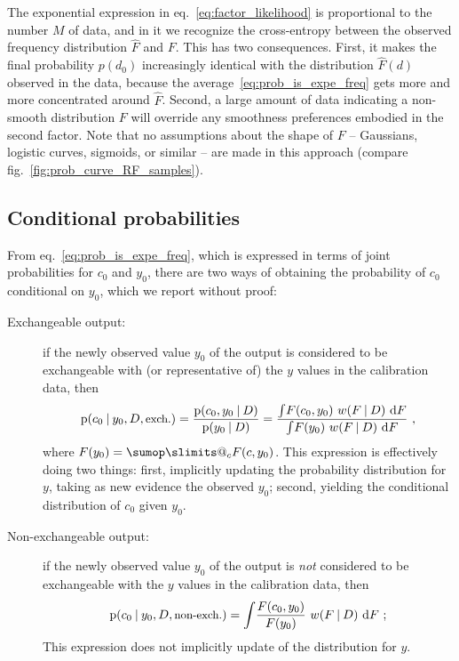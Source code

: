 \documentclass[\ifafour a4paper,12pt,\else a5paper,10pt,\fi%
onecolumn,oneside,article,%
british%
]{memoir}
\makeatletter
\theoremstyle{remark}
\theoremstyle{innote}
\def\sum{\DOTSI\sumop\slimits@}
\newcommand*{\di}{\mathrm{d}}%
\newcommand*{\p}{\mathrm{p}}%
\renewcommand*{\|}[1][]{\nonscript\:#1\vert\nonscript\:\mathopen{}}
\newcommand*{\eqn}{eq.}%
\newcommand*{\fig}{fig.}%
\newcommand*{\wf}{w}
\newcommand*{\texts}[1]{\text{\small #1}}
\makeatother
\begin{document}
The exponential expression in \eqn~\eqref{eq:factor_likelihood} is proportional to the number $M$ of data, and in it we recognize the cross-entropy between the observed frequency distribution $\hat{F}$ and $F$. This has two consequences. First, it makes the final probability $p(d_{0})$ increasingly identical with the distribution $\hat{F}(d)$ observed in the data, because the average~\eqref{eq:prob_is_expe_freq} gets more and more concentrated around $\hat{F}$. Second, a large amount of data indicating a non-smooth distribution $F$ will override any smoothness preferences embodied in the second factor. Note that no assumptions about the shape of $F$ -- Gaussians, logistic curves, sigmoids, or similar -- are made in this approach (compare \fig~\ref{fig:prob_curve_RF_samples}).

\subsection{Conditional probabilities}
\label{sec:cond_probs}

From \eqn~\eqref{eq:prob_is_expe_freq}, which is expressed in terms of joint probabilities for $c_{0}$ and $y_{0}$, there are two ways of obtaining the probability of $c_{0}$ conditional on $y_{0}$, which we report without proof:
\begin{description}
\item[Exchangeable output:] if the newly observed value $y_{0}$ of the output is considered to be exchangeable with (or representative of) the $y$ values in the calibration data, then
  \begin{equation}
    \label{eq:c_cond_y_exchangeable}
    \p(c_{0} \| y_{0}, D, \texts{exch.}) =
    \frac{\p(c_{0}, y_{0} \| D)}{ \p(y_{0} \| D)} =
    \frac{\int\! F(c_{0}, y_{0})\ \wf(F \| D)\ \di F}{
      \int\! F(y_{0})\ \wf(F \| D)\ \di F} \ ,
  \end{equation}
  where $F(y_{0}) = \sum_{c}F(c, y_{0})$. This expression is effectively doing two things: first, implicitly updating the probability distribution for $y$, taking as new evidence the observed $y_{0}$; second, yielding the conditional distribution of $c_{0}$ given $y_{0}$.
    \item[Non-exchangeable output:] if the newly observed value $y_{0}$ of the output is \emph{not} considered to be exchangeable with the $y$ values in the calibration data, then
  \begin{equation}
    \label{eq:c_cond_y_exchangeable}
    \p(c_{0} \| y_{0}, D, \texts{non-exch.}) =
    \int\! \frac{F(c_{0}, y_{0})}{F(y_{0})}\ \wf(F \| D)\ \di F \ ;
  \end{equation}
  This expression does not implicitly update of the distribution for $y$.
\end{description}
\end{document}
